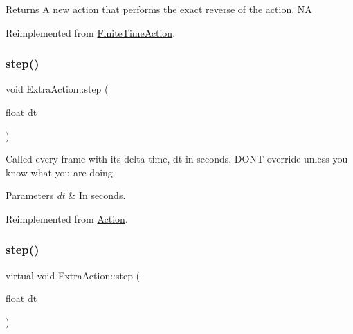 \begin{DoxyReturn}{Returns}
A new action that performs the exact reverse of the action.  NA 
\end{DoxyReturn}


Reimplemented from \hyperlink{classFiniteTimeAction_a886bbdd2dc82167fe6ffae664c22dacc}{Finite\+Time\+Action}.

\mbox{\label{classExtraAction_a7e15c6b27f49d1057bf81bd0527f041b}} 
\subsubsection{\texorpdfstring{step()}{step()}\hspace{0.1cm}{\footnotesize\ttfamily [1/2]}}
{\footnotesize\ttfamily void Extra\+Action\+::step (\begin{DoxyParamCaption}\item[{float}]{dt }\end{DoxyParamCaption})\hspace{0.3cm}{\ttfamily [virtual]}}

Called every frame with it\textquotesingle{}s delta time, dt in seconds. D\+ON\textquotesingle{}T override unless you know what you are doing.


\begin{DoxyParams}{Parameters}
{\em dt} & In seconds. \\
\hline
\end{DoxyParams}


Reimplemented from \hyperlink{classAction_a9a64ee9e8e977672748f70893ebaff66}{Action}.

\mbox{\label{classExtraAction_adf523dd380d7c8e093c58473e2c84304}} 
\subsubsection{\texorpdfstring{step()}{step()}\hspace{0.1cm}{\footnotesize\ttfamily [2/2]}}
{\footnotesize\ttfamily virtual void Extra\+Action\+::step (\begin{DoxyParamCaption}\item[{float}]{dt }\end{DoxyParamCaption})\hspace{0.3cm}{\ttfamily [virtual]}}

